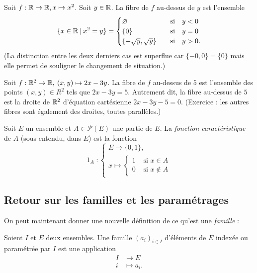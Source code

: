 \begin{exemple}
Soit $f : \mathbb{R}\to \mathbb{R}, x\mapsto x^2$. Soit $y\in \mathbb{R}$. La fibre de $f$ au-dessus de $y$ est l'ensemble 
\[
\{x\in \mathbb{R}\:|\: x^2=y\} = 
\begin{cases}
\varnothing &\quad\text{si}\quad y<0\\
\{0\} & \quad\text{si}\quad y=0\\
\{-\sqrt y, \sqrt y\}& \quad\text{si}\quad y>0.
\end{cases}
\]
(La distinction entre les deux derniers cas est superflue car $\{-0,0\}=\{0\}$ mais elle permet de souligner le changement de situation.)
\end{exemple}

\begin{exemple}
Soit $f : \mathbb{R}^2\to \mathbb{R},\: (x,y)\mapsto 2x-3y$. La fibre de $f$ au-dessus de $5$ est l'ensemble des points $(x,y) \in R^2$ tels que $2x-3y=5$. Autrement dit, la fibre au-dessus de $5$ est la droite de $\mathbb{R}^2$ d'équation cartésienne $2x-3y-5=0$. (Exercice : les autres fibres sont également des droites, toutes parallèles.)
\end{exemple}

\begin{definition}
Soit $E$ un ensemble et $A\in \mathcal P(E)$ une partie de $E$. La \emph{fonction caractéristique} de $A$ (sous-entendu, dans $E$) est la fonction 
\[
\operatorname{1}_A :\begin{cases}E \to \{0,1\},\\ x\mapsto \begin{cases}1&\text{ si } x\in A\\0&\text{ si } x\not\in A\end{cases}\end{cases}
\]
\end{definition}




\subsection{Retour sur les familles et les paramétrages}
\label{subsec-retour-parametrage-familles}

On peut maintenant donner une nouvelle définition de ce qu'est une \emph{famille} :

\begin{definition}
Soient $I$ et $E$ deux ensembles. Une famille $(a_i)_{i\in I}$ d'éléments de $E$ indexée ou paramétrée par $I$ est une application
\begin{align*}
I&\to E\\ i&\mapsto a_i.
\end{align*}
\end{definition}

